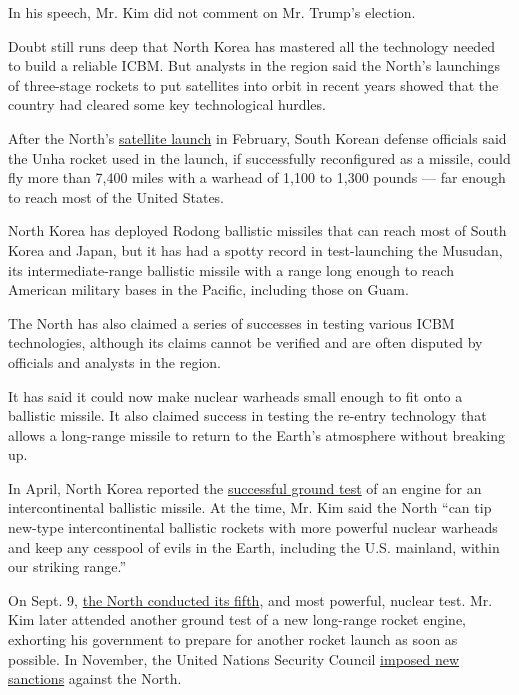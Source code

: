 In his speech, Mr. Kim did not comment on Mr. Trump's election.

Doubt still runs deep that North Korea has mastered all the technology
needed to build a reliable ICBM. But analysts in the region said the
North's launchings of three-stage rockets to put satellites into orbit
in recent years showed that the country had cleared some key
technological hurdles.

After the North's
\href{http://www.nytimes3xbfgragh.onion/2016/02/07/world/asia/north-korea-moves-up-rocket-launching-plan.html}{satellite
launch} in February, South Korean defense officials said the Unha rocket
used in the launch, if successfully reconfigured as a missile, could fly
more than 7,400 miles with a warhead of 1,100 to 1,300 pounds --- far
enough to reach most of the United States.

North Korea has deployed Rodong ballistic missiles that can reach most
of South Korea and Japan, but it has had a spotty record in
test-launching the Musudan, its intermediate-range ballistic missile
with a range long enough to reach American military bases in the
Pacific, including those on Guam.

The North has also claimed a series of successes in testing various ICBM
technologies, although its claims cannot be verified and are often
disputed by officials and analysts in the region.

It has said it could now make nuclear warheads small enough to fit onto
a ballistic missile. It also claimed success in testing the re-entry
technology that allows a long-range missile to return to the Earth's
atmosphere without breaking up.

In April, North Korea reported the
\href{http://www.nytimes3xbfgragh.onion/2016/04/10/world/asia/north-korea-says-it-successfully-tested-missile-engine.html}{successful
ground test} of an engine for an intercontinental ballistic missile. At
the time, Mr. Kim said the North ``can tip new-type intercontinental
ballistic rockets with more powerful nuclear warheads and keep any
cesspool of evils in the Earth, including the U.S. mainland, within our
striking range.''

On Sept. 9,
\href{https://www.nytimes3xbfgragh.onion/2016/09/21/world/asia/north-korea-says-it-has-tested-a-new-long-range-rocket-engine.html}{the
North conducted its fifth}, and most powerful, nuclear test. Mr. Kim
later attended another ground test of a new long-range rocket engine,
exhorting his government to prepare for another rocket launch as soon as
possible. In November, the United Nations Security Council
\href{http://www.nytimes3xbfgragh.onion/2016/11/30/world/asia/north-korea-un-sanctions.html}{imposed
new sanctions} against the North.


